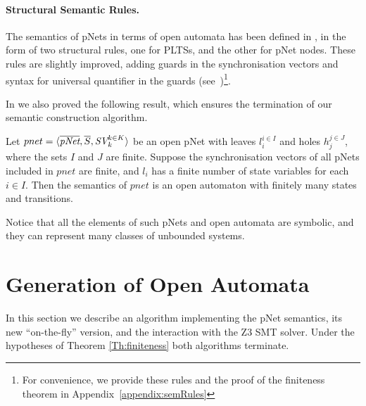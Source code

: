 \documentclass[smallcondensed]{svjour3}
\newcommand{\noteSB}[2][color=green!40, size=\tiny]{\todo[#1]{{\bf Simon: } {#2}}}
\newcommand{\noteEM}[2][color=blue!40, size=\tiny]{\todo[#1]{{\bf Eric: } {#2}}}
\newcommand{\ie}[1][\ ]{i.e.#1}
\begin{document}
\paragraph{Structural Semantic Rules.}
The semantics of pNets in terms of open automata has been defined in
\cite{henrio:Forte2016}, in the form of two structural rules, one for
PLTSs, and the other for pNet nodes. These rules are slightly improved, adding guards in the synchronisation vectors and syntax for universal quantifier in the guards (see~\cite{Avocs-RR})\footnote{For convenience, we provide these rules and the proof of the finiteness theorem in Appendix~\ref{appendix:semRules}}. 
  
In \cite{henrio:Forte2016} we also proved the following result, which
ensures the termination of our semantic construction algorithm.
\begin{theorem}[Finiteness]
  \label{Th:finiteness}
   Let $pnet=\langle \overline{\pNet},\overline{S}, \symb{SV}_k^{k\in K}\rangle$ be an open pNet  with leaves $l_i^{i\in I}$ and holes $h_j^{j\in
 	J}$, where the sets $I$ and $J$ are finite. Suppose the synchronisation vectors of all pNets 
 included in  $pnet$   are finite, and 
 $l_i $ has a finite number of state variables for each $i\in I$. Then the semantics of $pnet$ is an open automaton 
 with finitely many states and transitions.
\end{theorem}
Notice that all the elements of such pNets and open automata are symbolic, and they can represent many classes of unbounded systems. 


\section{Generation of Open Automata}
\label{section:implementation}
In this section we describe an algorithm implementing the pNet
semantics, its new ``on-the-fly'' version, and the interaction with the
Z3 SMT solver. Under the hypotheses of Theorem \ref{Th:finiteness} 
both algorithms terminate. 

\end{document}
